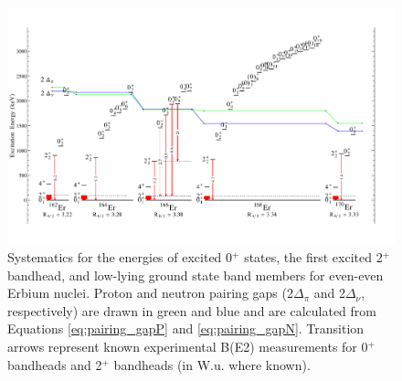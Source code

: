 \begin{landscape}
\begin{figure}[ht] 
\begin{center}
\includegraphics[height=0.8\textheight]{figures/SciDraw_ErSystematics.pdf}
\caption{Systematics for the energies of excited 0$^+$ states, the first excited 2$^+$ bandhead, and low-lying ground state band members for even-even Erbium nuclei. Proton and neutron pairing gaps (2$\Delta_\pi$ and 2$\Delta_\nu$, respectively) are drawn in green and blue and are calculated from Equations \ref{eq:pairing_gapP} and \ref{eq:pairing_gapN}. Transition arrows represent known experimental B(E2) measurements for 0$^+$ bandheads and 2$^+$ bandheads (in W.u. where known). \label{fig:ErSystematics}}
\end{center}
\end{figure}
\end{landscape}


